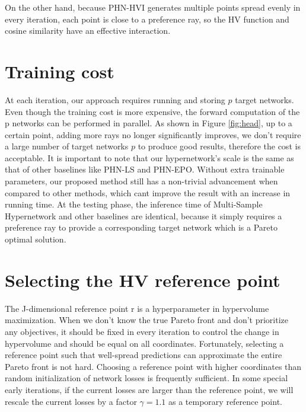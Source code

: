 \documentclass[letterpaper]{article} %
\newcommand{\ourmodel}{PHN-HVI }
\begin{document}
On the other hand, because \ourmodel generates multiple points spread evenly in every iteration, each point is close to a preference ray, so the HV function and cosine similarity have an effective interaction.


\section{Training cost}
At each iteration, our approach requires running and storing $p$ target networks. Even though the training cost is more expensive, the forward computation of the p networks can be performed in parallel. As shown in Figure \ref{fig:head}, up to a certain point, adding more rays no longer significantly improves, we don't require a large number of target networks $p$ to produce good results, therefore the cost is acceptable. It is important to note that our hypernetwork's scale is the same as that of other baselines like PHN-LS and PHN-EPO. Without extra trainable parameters, our proposed method still has a non-trivial advancement when compared to other methods, which cant improve the result with an increase in running time. At the testing phase, the inference time of Multi-Sample Hypernetwork and other baselines are identical, because it simply requires a preference ray to provide a corresponding target network which is a Pareto optimal solution.

\section{Selecting the HV reference point}
The J-dimensional reference point r is a hyperparameter in hypervolume maximization. When we don't know the true Pareto front and don't prioritize any objectives, it should be fixed in every iteration to control the change in hypervolume and should be equal on all coordinates. Fortunately, selecting a reference point such that well-spread predictions can approximate the entire Pareto front is not hard. Choosing a reference point with higher coordinates than random initialization of network losses is frequently sufficient. In some special early iterations, if the current losses are larger than the reference point, we will rescale the current losses by a factor $\gamma=1.1$ as a temporary reference point.
\end{document}
